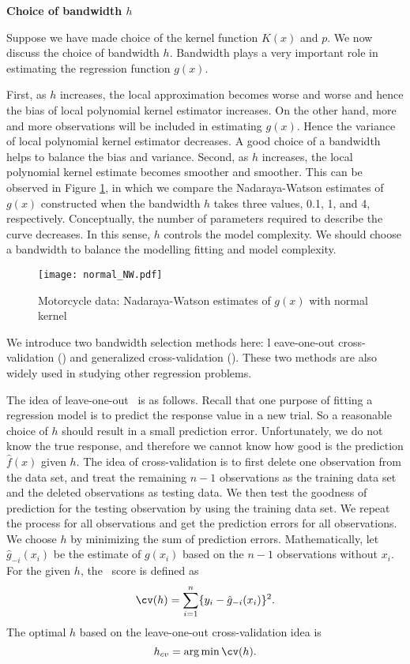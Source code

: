 \vs\noindent
{\bf Choice of bandwidth $h$}

Suppose we have made choice of the kernel function $K(x)$ and $p$. 
We now discuss the choice of bandwidth $h$. 
Bandwidth plays a very important role in estimating the regression
function $g(x)$. 

First, as $h$ increases, the local approximation becomes worse and worse
and hence the bias of local polynomial kernel estimator increases.
On the other hand, more and more observations will be included in
estimating $g(x)$.
Hence the variance of local polynomial kernel estimator decreases. 
A good choice of a bandwidth helps to balance the bias and variance. 
Second, as $h$ increases, the local polynomial kernel estimate
becomes smoother and smoother. 
This can be observed in Figure \ref{normal_nw}, in which we compare the 
Nadaraya-Watson estimates of $g(x)$ constructed when the
bandwidth $h$ takes three values, 0.1, 1, and 4, respectively. 
Conceptually, the number of parameters required to describe the curve decreases.
In this sense, $h$ controls the model complexity. We should choose 
a bandwidth to balance the modelling fitting and model complexity. 
\begin{figure}[ht]
\caption{Motorcycle data: Nadaraya-Watson estimates of $g(x)$ with normal kernel}
\centerline{ \texttt{[image: normal\_NW.pdf]}}
\label{normal_nw}
\end{figure}

\clearpage

We introduce two bandwidth selection methods here: l
eave-one-out cross-validation (\cv) and 
generalized cross-validation (\gcv).
These two methods are also widely used in studying
other regression problems. 

The idea of leave-one-out \cv\ is as follows. 
Recall that one purpose of fitting a regression model is to 
predict the response value in a new trial. 
So a reasonable choice of $h$ should result in a small prediction error. 
Unfortunately, we do not know the true response, and therefore
we cannot know how good is the prediction $\hat f(x)$ given $h$.  
The idea of cross-validation is to first delete one observation
from the data set, and treat the remaining $n-1$ observations 
as the training data set and the deleted observations as testing data. 
We then test the goodness of prediction for the testing observation 
by using the training data set. 
We repeat the process for all observations and get the prediction errors 
for all observations. We choose $h$ by minimizing the sum of prediction errors. 
Mathematically, let $\hat g_{-i}(x_i)$ be the estimate of $g(x_i)$ based 
on the $n-1$ observations without $x_i$. 
For the given $h$, 
the \cv\ score is defined as 
$$
\cv(h)=\sum_{i=1}^n\{y_i-\hat g_{-i}(x_i)\}^2.
$$
The optimal $h$ based on the leave-one-out cross-validation idea is 
$$
h_{cv}=\arg\min \cv(h).
$$

